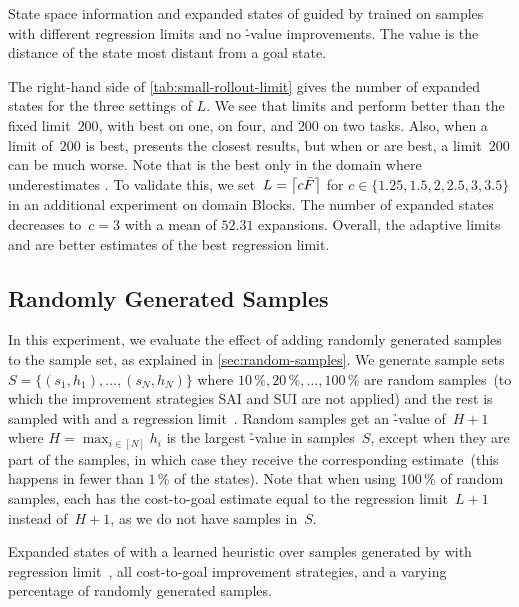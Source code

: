 \begin{table}[tb]
    \caption[State space information and expanded states with different regression limits.]{State space information and expanded states of \gbfs guided by \hnn trained on \bfsrw samples with different regression limits and no \h-value improvements. The value \ssdiameter is the distance of the state most distant from a goal state.}
    \label{tab:small-rollout-limit}
    \addmargin
    \centering
    
\end{table}

The right-hand side of \cref{tab:small-rollout-limit} gives the number of expanded states for the three settings of $L$. We see that limits \facts and \meanfx perform better than the fixed limit~$200$, with \facts best on one, \meanfx on four, and $200$ on two tasks. Also, when a limit of~$200$ is best, \facts presents the closest results, but when \facts or \meanfx are best, a limit~$200$ can be much worse. Note that \facts is the best only in the domain where \meanfx underestimates \ssdiameter. To validate this, we set~$L=\left\lceil c\bar F\right\rceil$ for $c\in\{1.25,1.5,2,2.5,3,3.5\}$ in an additional experiment on domain Blocks. The number of expanded states decreases to~$c=3$ with a mean of $52.31$ expansions. Overall, the adaptive limits \facts and \meanfx are better estimates of the best regression limit.

\subsection{Randomly Generated Samples}
\label{sec:small-exps-random-samples}

In this experiment, we evaluate the effect of adding randomly generated samples to the sample set, as explained in \cref{sec:random-samples}. We generate sample sets~$S=\{(s_1,h_1),\ldots,(s_N,h_N)\}$ where $10\,\%, 20\,\%,\ldots,100\,\%$ are random samples~(to which the improvement strategies SAI and SUI are not applied) and the rest is sampled with \bfsrw and a regression limit~\meanfx. Random samples get an \h-value of~$H+1$ where $H=\max_{i\in[N]} h_i$ is the largest \h-value in samples~$S$, except when they are part of the samples, in which case they receive the corresponding estimate~(this happens in fewer than $1\,\%$ of the states). Note that when using $100\,\%$ of random samples, each has the cost-to-goal estimate equal to the regression limit~$L+1$ instead of~$H+1$, as we do not have samples in~$S$.

\begin{table}[tb]
    \caption[Expanded states from a varying percentage of randomly generated samples.]{Expanded states of \gbfs with a learned heuristic over samples generated by \bfsrw with regression limit~\meanfx, all cost-to-goal improvement strategies, and a varying percentage of randomly generated samples.}
    \label{tab:small-random-samples}
    \addmargin
    \centering
    
\end{table}

